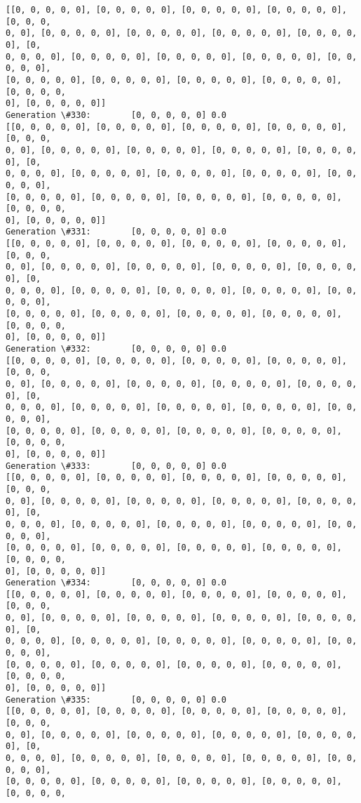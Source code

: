 \documentclass[11pt]{article}
\begin{document}
\begin{Verbatim}[commandchars=\\\{\}]
[[0, 0, 0, 0, 0], [0, 0, 0, 0, 0], [0, 0, 0, 0, 0], [0, 0, 0, 0, 0], [0, 0, 0,
0, 0], [0, 0, 0, 0, 0], [0, 0, 0, 0, 0], [0, 0, 0, 0, 0], [0, 0, 0, 0, 0], [0,
0, 0, 0, 0], [0, 0, 0, 0, 0], [0, 0, 0, 0, 0], [0, 0, 0, 0, 0], [0, 0, 0, 0, 0],
[0, 0, 0, 0, 0], [0, 0, 0, 0, 0], [0, 0, 0, 0, 0], [0, 0, 0, 0, 0], [0, 0, 0, 0,
0], [0, 0, 0, 0, 0]]
Generation \#330:        [0, 0, 0, 0, 0] 0.0
[[0, 0, 0, 0, 0], [0, 0, 0, 0, 0], [0, 0, 0, 0, 0], [0, 0, 0, 0, 0], [0, 0, 0,
0, 0], [0, 0, 0, 0, 0], [0, 0, 0, 0, 0], [0, 0, 0, 0, 0], [0, 0, 0, 0, 0], [0,
0, 0, 0, 0], [0, 0, 0, 0, 0], [0, 0, 0, 0, 0], [0, 0, 0, 0, 0], [0, 0, 0, 0, 0],
[0, 0, 0, 0, 0], [0, 0, 0, 0, 0], [0, 0, 0, 0, 0], [0, 0, 0, 0, 0], [0, 0, 0, 0,
0], [0, 0, 0, 0, 0]]
Generation \#331:        [0, 0, 0, 0, 0] 0.0
[[0, 0, 0, 0, 0], [0, 0, 0, 0, 0], [0, 0, 0, 0, 0], [0, 0, 0, 0, 0], [0, 0, 0,
0, 0], [0, 0, 0, 0, 0], [0, 0, 0, 0, 0], [0, 0, 0, 0, 0], [0, 0, 0, 0, 0], [0,
0, 0, 0, 0], [0, 0, 0, 0, 0], [0, 0, 0, 0, 0], [0, 0, 0, 0, 0], [0, 0, 0, 0, 0],
[0, 0, 0, 0, 0], [0, 0, 0, 0, 0], [0, 0, 0, 0, 0], [0, 0, 0, 0, 0], [0, 0, 0, 0,
0], [0, 0, 0, 0, 0]]
Generation \#332:        [0, 0, 0, 0, 0] 0.0
[[0, 0, 0, 0, 0], [0, 0, 0, 0, 0], [0, 0, 0, 0, 0], [0, 0, 0, 0, 0], [0, 0, 0,
0, 0], [0, 0, 0, 0, 0], [0, 0, 0, 0, 0], [0, 0, 0, 0, 0], [0, 0, 0, 0, 0], [0,
0, 0, 0, 0], [0, 0, 0, 0, 0], [0, 0, 0, 0, 0], [0, 0, 0, 0, 0], [0, 0, 0, 0, 0],
[0, 0, 0, 0, 0], [0, 0, 0, 0, 0], [0, 0, 0, 0, 0], [0, 0, 0, 0, 0], [0, 0, 0, 0,
0], [0, 0, 0, 0, 0]]
Generation \#333:        [0, 0, 0, 0, 0] 0.0
[[0, 0, 0, 0, 0], [0, 0, 0, 0, 0], [0, 0, 0, 0, 0], [0, 0, 0, 0, 0], [0, 0, 0,
0, 0], [0, 0, 0, 0, 0], [0, 0, 0, 0, 0], [0, 0, 0, 0, 0], [0, 0, 0, 0, 0], [0,
0, 0, 0, 0], [0, 0, 0, 0, 0], [0, 0, 0, 0, 0], [0, 0, 0, 0, 0], [0, 0, 0, 0, 0],
[0, 0, 0, 0, 0], [0, 0, 0, 0, 0], [0, 0, 0, 0, 0], [0, 0, 0, 0, 0], [0, 0, 0, 0,
0], [0, 0, 0, 0, 0]]
Generation \#334:        [0, 0, 0, 0, 0] 0.0
[[0, 0, 0, 0, 0], [0, 0, 0, 0, 0], [0, 0, 0, 0, 0], [0, 0, 0, 0, 0], [0, 0, 0,
0, 0], [0, 0, 0, 0, 0], [0, 0, 0, 0, 0], [0, 0, 0, 0, 0], [0, 0, 0, 0, 0], [0,
0, 0, 0, 0], [0, 0, 0, 0, 0], [0, 0, 0, 0, 0], [0, 0, 0, 0, 0], [0, 0, 0, 0, 0],
[0, 0, 0, 0, 0], [0, 0, 0, 0, 0], [0, 0, 0, 0, 0], [0, 0, 0, 0, 0], [0, 0, 0, 0,
0], [0, 0, 0, 0, 0]]
Generation \#335:        [0, 0, 0, 0, 0] 0.0
[[0, 0, 0, 0, 0], [0, 0, 0, 0, 0], [0, 0, 0, 0, 0], [0, 0, 0, 0, 0], [0, 0, 0,
0, 0], [0, 0, 0, 0, 0], [0, 0, 0, 0, 0], [0, 0, 0, 0, 0], [0, 0, 0, 0, 0], [0,
0, 0, 0, 0], [0, 0, 0, 0, 0], [0, 0, 0, 0, 0], [0, 0, 0, 0, 0], [0, 0, 0, 0, 0],
[0, 0, 0, 0, 0], [0, 0, 0, 0, 0], [0, 0, 0, 0, 0], [0, 0, 0, 0, 0], [0, 0, 0, 0,

\end{Verbatim}
\end{document}
